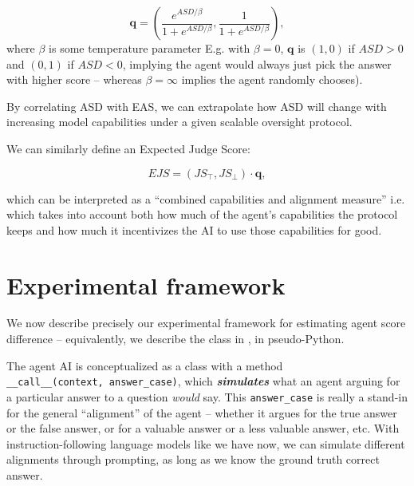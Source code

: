 \[\mathbf{q}=\left(\frac{e^{ASD/\beta}}{1+e^{ASD/\beta}}, \frac{1}{1+e^{ASD/\beta}}\right),\] where \(\beta\) is some temperature parameter E.g. with \(\beta=0\), $\mathbf{q}$ is $(1,0)$ if $ASD>0$ and $(0,1)$ if $ASD<0$, implying the agent would always just pick the answer with higher score -- whereas \(\beta=\infty\) implies the agent randomly chooses).

By correlating ASD with EAS, we can extrapolate how ASD will change with increasing model capabilities under a given scalable oversight protocol.

We can similarly define an Expected Judge Score:

\[EJS=(JS_\top,JS_\bot)\cdot\mathbf{q},\]

which can be interpreted as a ``combined capabilities and alignment measure'' i.e. which takes into account both how much of the agent's capabilities the protocol keeps and how much it incentivizes the AI to use those capabilities for good.

\section{Experimental framework}
\label{sec:formal}

We now describe precisely our experimental framework for estimating agent score difference -- equivalently, we describe the \Protocol{} class in \solib{}, in pseudo-Python.

The agent AI is conceptualized as a class \Agent{} with a method \texttt{\_\_call\_\_(context,\ answer\_case)}, which \textbf{\emph{simulates}} what an agent arguing for a particular answer to a question \emph{would} say. This \texttt{answer\_case} is really a stand-in for the general ``alignment'' of the agent -- whether it argues for the true answer or the false answer, or for a valuable answer or a less valuable answer, etc. With instruction-following language models like we have now, we can simulate different alignments through prompting, as long as we know the ground truth correct answer.




